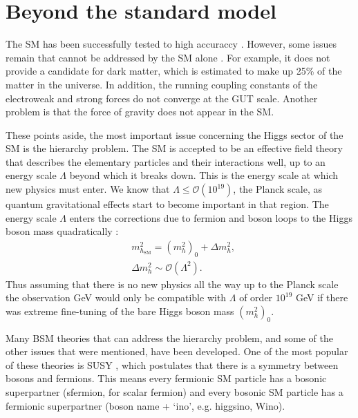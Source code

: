 \section{Beyond the standard model}
\label{sec:theory_BSM}
The \ac{SM} has been successfully tested to high accuraccy \cite{pdg-2014}. However,
some issues remain that cannot be addressed by the \ac{SM} alone \cite{griffiths}.
For example, it does not provide a candidate for dark matter, which is estimated
to make up 25\% of the matter in the universe.
In addition, the running coupling constants of the electroweak and
strong forces do not converge at the GUT scale. Another problem is that the force
of gravity does not appear in the \ac{SM}.

These points aside, the most important issue concerning
the Higgs sector of the \ac{SM} is the hierarchy problem.
The \ac{SM}
is accepted to be an effective field theory that describes
the elementary particles and their interactions well, up to an energy scale $\Lambda$ beyond which it breaks down.
This is the energy scale at which new physics must enter.
We know that $\Lambda \leq \mathcal{O}(10^{19})$, the Planck scale, as quantum 
gravitational effects start to become important in that region. The energy scale $\Lambda$ enters
the corrections due to fermion and boson loops to the Higgs boson mass quadratically \cite{MSSM-carena-haber}:
\begin{equation}\label{eqn:mh_hierarchy}
\begin{split}
&m_{h_{\text{SM}}}^2  = (m_h^2)_0 + \Delta m_h^2,\\
&\Delta m_h^2 \sim \mathcal{O}(\Lambda^2).
\end{split}
\end{equation}
Thus assuming that there is no new physics all the way up to
the Planck scale the observation  GeV would only be compatible with $\Lambda$ of order $10^{19}$ GeV
if there was extreme fine-tuning of the bare Higgs boson mass $(m_h^2)_0$.

Many \acf{BSM} theories that can address the hierarchy problem, and some of
the other issues that were mentioned, have been developed.
One of the most
popular of these theories is \acf{SUSY} \cite{SUSY-primer}, which postulates
that there is a symmetry between bosons and fermions. This means every fermionic
\ac{SM} particle has a bosonic superpartner (sfermion, for scalar fermion)
and every bosonic \ac{SM} particle
has a fermionic superpartner (boson name + `ino', e.g. higgsino, Wino).

